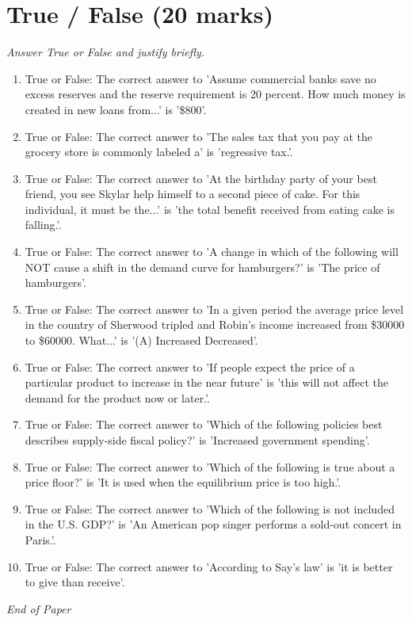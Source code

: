 \documentclass[12pt]{article}
\begin{document}
\section*{True / False (20 marks)}
\textit{Answer True or False and justify briefly.}
\begin{enumerate}[label=\arabic*.]
\item True or False: The correct answer to 'Assume commercial banks save no excess reserves and the reserve requirement is 20 percent. How much money is created in new loans from...' is '\$800'.
\item True or False: The correct answer to 'The sales tax that you pay at the grocery store is commonly labeled a' is 'regressive tax.'.
\item True or False: The correct answer to 'At the birthday party of your best friend, you see Skylar help himself to a second piece of cake. For this individual, it must be the...' is 'the total benefit received from eating cake is falling.'.
\item True or False: The correct answer to 'A change in which of the following will NOT cause a shift in the demand curve for hamburgers?' is 'The price of hamburgers'.
\item True or False: The correct answer to 'In a given period the average price level in the country of Sherwood tripled and Robin's income increased from \$30000 to \$60000. What...' is '(A) Increased Decreased'.
\item True or False: The correct answer to 'If people expect the price of a particular product to increase in the near future' is 'this will not affect the demand for the product now or later.'.
\item True or False: The correct answer to 'Which of the following policies best describes supply-side fiscal policy?' is 'Increased government spending'.
\item True or False: The correct answer to 'Which of the following is true about a price floor?' is 'It is used when the equilibrium price is too high.'.
\item True or False: The correct answer to 'Which of the following is not included in the U.S. GDP?' is 'An American pop singer performs a sold-out concert in Paris.'.
\item True or False: The correct answer to 'According to Say's law' is 'it is better to give than receive'.
\end{enumerate}

\vfill
\noindent\textit{End of Paper}
\end{document}
